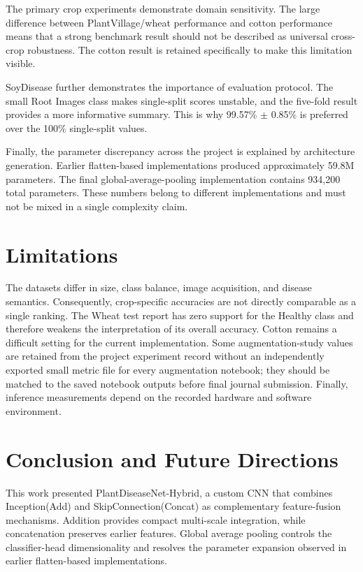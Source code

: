 \documentclass[a4paper,fleqn]{cas-dc}
\begin{document}
The primary crop experiments demonstrate domain sensitivity. The large difference between PlantVillage/wheat performance and cotton performance means that a strong benchmark result should not be described as universal cross-crop robustness. The cotton result is retained specifically to make this limitation visible.

SoyDisease further demonstrates the importance of evaluation protocol. The small Root Images class makes single-split scores unstable, and the five-fold result provides a more informative summary. This is why 99.57\% $\pm$ 0.85\% is preferred over the 100\% single-split values.

Finally, the parameter discrepancy across the project is explained by architecture generation. Earlier flatten-based implementations produced approximately 59.8M parameters. The final global-average-pooling implementation contains 934,200 total parameters. These numbers belong to different implementations and must not be mixed in a single complexity claim.

\section{Limitations}
The datasets differ in size, class balance, image acquisition, and disease semantics. Consequently, crop-specific accuracies are not directly comparable as a single ranking. The Wheat test report has zero support for the Healthy class and therefore weakens the interpretation of its overall accuracy. Cotton remains a difficult setting for the current implementation. Some augmentation-study values are retained from the project experiment record without an independently exported small metric file for every augmentation notebook; they should be matched to the saved notebook outputs before final journal submission. Finally, inference measurements depend on the recorded hardware and software environment.

\section{Conclusion and Future Directions}
This work presented PlantDiseaseNet-Hybrid, a custom CNN that combines Inception(Add) and SkipConnection(Concat) as complementary feature-fusion mechanisms. Addition provides compact multi-scale integration, while concatenation preserves earlier features. Global average pooling controls the classifier-head dimensionality and resolves the parameter expansion observed in earlier flatten-based implementations.
\end{document}
